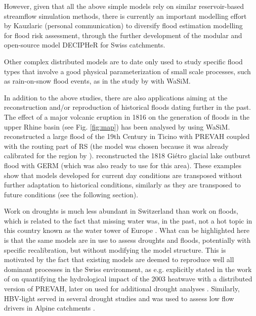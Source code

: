 \documentclass[10pt,a4paper]{article}
\begin{document}
However, given that all the above simple models rely on similar reservoir-based streamflow simulation methods, there is currently an important modelling effort by Kauzlaric (personal communication) to diversify flood estimation modelling for flood risk assessment, through the further development of the modular and open-source model DECIPHeR for Swiss catchments.

Other complex distributed models are to date only used to study specific flood types that involve a good physical parameterization of small scale processes, such as rain-on-snow flood events, as in the study by \citet{Rossler2014} with WaSiM. 

In addition to the above studies, there are also applications aiming at the reconstruction and/or reproduction of historical floods dating further in the past. The effect of a major volcanic eruption in 1816 on the generation of floods in the upper Rhine basin (see Fig. \ref{fig:map}) has been analysed by \citet{Rossler2018} using WaSiM. \citet{Stucki2018} reconstructed a large flood of the 19th Century in Ticino with PREVAH coupled with the routing part of RS (the model was chosen because it was already calibrated for the region by \citet{Andres_2016}). \citet{Ancey2019} reconstructed the 1818 Giétro glacial lake outburst flood with GERM (which was also ready to use for this area). These examples show that models developed for current day conditions are transposed without further adaptation to historical conditions, similarly as they are transposed to future conditions (see the following section).

Work on droughts is much less abundant in Switzerland than work on floods, which is related to the fact that missing water was, in the past, not a hot topic in this country known as the water tower of Europe \citep{Milano2015}. What can be highlighted here is that the same models are in use to assess droughts and floods, potentially with specific recalibration, but without modifying the model structure. This is motivated by the fact that existing models are deemed to reproduce well all dominant processes in the Swiss environment, as e.g. explicitly stated in the work of \citet{Zappa2007a} on quantifying the hydrological impact of the 2003 heatwave with a distributed version of PREVAH, later on used for additional drought analyses \citep{Brunner2019,Zappa2019}. Similarly, HBV-light served in several drought studies \citep{Staudinger2014,Staudinger2014a,Staudinger2015} and was used to assess low flow drivers in Alpine catchments \citep{Arnoux_2020}.
\end{document}
